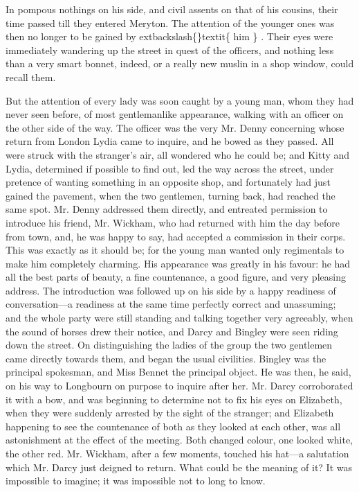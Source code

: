 \documentclass[10pt]{book}
\begin{document}
   In pompous nothings on his side, and civil assents on that of his
cousins, their time passed till they entered Meryton. The attention of
the younger ones was then no longer to be gained by
   	extbackslash\{\}textit\{
    him
   \}
   . Their eyes
were immediately wandering up the street in quest of the officers, and
nothing less than a very smart bonnet, indeed, or a really new muslin in
a shop window, could recall them.
  

   But the attention of every lady was soon caught by a young man, whom
they had never seen before, of most gentlemanlike appearance, walking
with an officer on the other side of the way. The officer was the very
Mr. Denny concerning whose return from London Lydia came to inquire, and
he bowed as they passed. All were struck with the stranger’s air, all
wondered who he could be; and Kitty and Lydia, determined if possible
   to find out, led the way across the street, under pretence of wanting
something in an opposite shop, and fortunately had just gained the
pavement, when the two gentlemen, turning back, had reached the same
spot. Mr. Denny addressed them directly, and entreated permission to
introduce his friend, Mr. Wickham, who had returned with him the day
before from town, and, he was happy to say, had accepted a commission in
their corps. This was exactly as it should be; for the young man wanted
only regimentals to make him completely charming. His appearance was
greatly in his favour: he had all the best parts of beauty, a fine
countenance, a good figure, and very pleasing address. The introduction
was followed up on his side by a happy readiness of conversation—a
readiness at the same time perfectly correct and unassuming; and the
whole party were still standing and talking together very agreeably,
when the sound of horses drew their notice, and Darcy and Bingley were
seen riding down the street. On distinguishing the ladies of the group
the two gentlemen came directly towards them, and began the usual
civilities. Bingley was the principal spokesman, and Miss Bennet the
principal object. He was then, he said, on his way to Longbourn on
purpose to inquire after her. Mr. Darcy corroborated it with a bow, and
was beginning to determine not to fix his eyes on Elizabeth, when they
were suddenly arrested by the sight of the stranger; and Elizabeth
happening to see the countenance of both as they looked at each other,
was all astonishment at the effect of the meeting. Both changed colour,
one looked white, the other red. Mr. Wickham, after a few moments,
touched his hat—a salutation which Mr. Darcy just deigned to return.
What could be the meaning of it?
   It was impossible to imagine; it was
impossible not to long to know.
  
\end{document}
